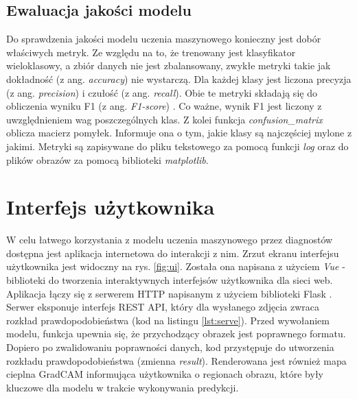 \subsection{Ewaluacja jakości modelu}

Do sprawdzenia jakości modelu uczenia maszynowego konieczny jest dobór właściwych metryk.
Ze względu na to, że trenowany jest klasyfikator wieloklasowy, a zbiór danych nie jest zbalansowany, zwykłe metryki takie jak dokładność (z ang. \textit{accuracy}) nie wystarczą.
Dla każdej klasy jest liczona precyzja (z ang. \textit{precision}) i czułość (z ang. \textit{recall}).
Obie te metryki składają się do obliczenia wyniku F1 (z ang. \textit{F1-score}) \cite{geron}.
Co ważne, wynik F1 jest liczony z uwzględnieniem wag poszczególnych klas.
Z kolei funkcja \textit{confusion\_matrix} oblicza macierz pomyłek.
Informuje ona o tym, jakie klasy są najczęściej mylone z jakimi.
Metryki są zapisywane do pliku tekstowego za pomocą funkcji \textit{log} oraz do plików obrazów za pomocą biblioteki \textit{matplotlib}.

\section{Interfejs użytkownika}

W celu łatwego korzystania z modelu uczenia maszynowego przez diagnostów dostępna jest aplikacja internetowa do interakcji z nim.
Zrzut ekranu interfejsu użytkownika jest widoczny na rys. \ref{fig:ui}.
Została ona napisana z użyciem \textit{Vue} \cite{vue} - biblioteki do tworzenia interaktywnych interfejsów użytkownika dla sieci web.
Aplikacja łączy się z serwerem HTTP napisanym z użyciem biblioteki Flask \cite{flask}.
Serwer eksponuje interfejs REST API, który dla wysłanego zdjęcia zwraca rozkład prawdopodobieństwa (kod na listingu \ref{lst:serve}).
Przed wywołaniem modelu, funkcja upewnia się, że przychodzący obrazek jest poprawnego formatu.
Dopiero po zwalidowaniu poprawności danych, kod przystępuje do utworzenia rozkładu prawdopodobieństwa (zmienna \textit{result}).
Renderowana jest również mapa cieplna GradCAM informująca użytkownika o regionach obrazu, które były kluczowe dla modelu w trakcie wykonywania predykcji.
%


